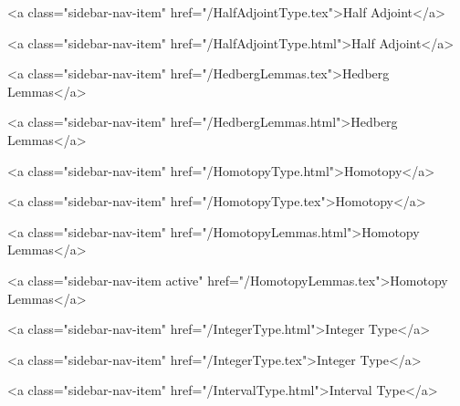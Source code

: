       
        
          <a class="sidebar-nav-item" href="/HalfAdjointType.tex">Half Adjoint</a>
        
      
    
      
        
          <a class="sidebar-nav-item" href="/HalfAdjointType.html">Half Adjoint</a>
        
      
    
      
        
          <a class="sidebar-nav-item" href="/HedbergLemmas.tex">Hedberg Lemmas</a>
        
      
    
      
        
          <a class="sidebar-nav-item" href="/HedbergLemmas.html">Hedberg Lemmas</a>
        
      
    
      
        
          <a class="sidebar-nav-item" href="/HomotopyType.html">Homotopy</a>
        
      
    
      
        
          <a class="sidebar-nav-item" href="/HomotopyType.tex">Homotopy</a>
        
      
    
      
        
          <a class="sidebar-nav-item" href="/HomotopyLemmas.html">Homotopy Lemmas</a>
        
      
    
      
        
          <a class="sidebar-nav-item active" href="/HomotopyLemmas.tex">Homotopy Lemmas</a>
        
      
    
      
        
          <a class="sidebar-nav-item" href="/IntegerType.html">Integer Type</a>
        
      
    
      
        
          <a class="sidebar-nav-item" href="/IntegerType.tex">Integer Type</a>
        
      
    
      
        
          <a class="sidebar-nav-item" href="/IntervalType.html">Interval Type</a>
        
      
    
